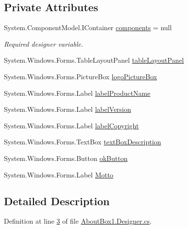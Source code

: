 \subsection*{\-Private \-Attributes}
\begin{DoxyCompactItemize}
\item 
\-System.\-Component\-Model.\-I\-Container \hyperlink{class_sr_p___classroom_inq_1_1_about_box___c_i_a988e74f2099fc5a7a3c4acd218b4c471}{components} = null
\begin{DoxyCompactList}\small\item\em \-Required designer variable. \end{DoxyCompactList}\item 
\-System.\-Windows.\-Forms.\-Table\-Layout\-Panel \hyperlink{class_sr_p___classroom_inq_1_1_about_box___c_i_ad10dbcf552f02d9075d3512e37346602}{table\-Layout\-Panel}
\item 
\-System.\-Windows.\-Forms.\-Picture\-Box \hyperlink{class_sr_p___classroom_inq_1_1_about_box___c_i_abc53ccfd3fe852b430d0542030f8ebf4}{logo\-Picture\-Box}
\item 
\-System.\-Windows.\-Forms.\-Label \hyperlink{class_sr_p___classroom_inq_1_1_about_box___c_i_a63c3b787bac631c7424ff015b247289c}{label\-Product\-Name}
\item 
\-System.\-Windows.\-Forms.\-Label \hyperlink{class_sr_p___classroom_inq_1_1_about_box___c_i_a2993cc4848bd6149f8162bf55a7fa310}{label\-Version}
\item 
\-System.\-Windows.\-Forms.\-Label \hyperlink{class_sr_p___classroom_inq_1_1_about_box___c_i_ab98fc181f4cf9c79b0c1459c04caeb70}{label\-Copyright}
\item 
\-System.\-Windows.\-Forms.\-Text\-Box \hyperlink{class_sr_p___classroom_inq_1_1_about_box___c_i_a3dbeb289a884177d325e5d3145c29427}{text\-Box\-Description}
\item 
\-System.\-Windows.\-Forms.\-Button \hyperlink{class_sr_p___classroom_inq_1_1_about_box___c_i_a1fba7bba76046a6ef3254d7f02cd88bb}{ok\-Button}
\item 
\-System.\-Windows.\-Forms.\-Label \hyperlink{class_sr_p___classroom_inq_1_1_about_box___c_i_a9e0b3276b452249890107b395c953e57}{\-Motto}
\end{DoxyCompactItemize}


\subsection{\-Detailed \-Description}


\-Definition at line \hyperlink{_about_box1_8_designer_8cs_source_l00003}{3} of file \hyperlink{_about_box1_8_designer_8cs_source}{\-About\-Box1.\-Designer.\-cs}.



